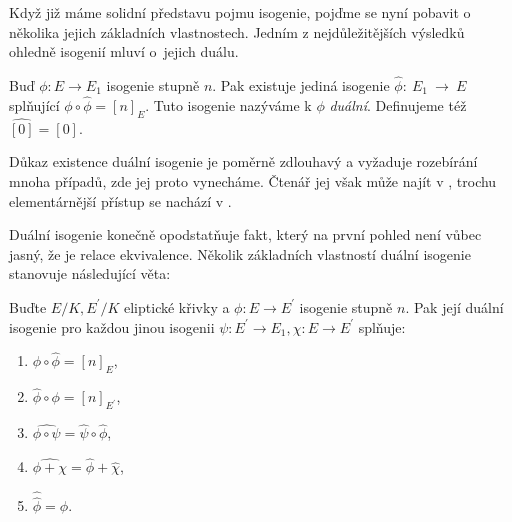 \documentclass[12pt]{report}
\begin{document}
Když již máme solidní představu pojmu isogenie, pojďme se nyní pobavit o několika jejich základních vlastnostech. Jedním z nejdůležitějších výsledků ohledně isogenií mluví o~jejich duálu.

\begin{veta}
Buď $\phi: E \longrightarrow E_1$ isogenie stupně $n$. Pak existuje jediná isogenie $\hat{\phi}:~E_1~\longrightarrow~E$ splňující $\phi \circ \hat{\phi} = [n]_E$. Tuto isogenie nazýváme k $\phi$ \textit{duální}. Definujeme též $\hat{[0]} = [0]$.
\end{veta}
Důkaz existence duální isogenie je poměrně zdlouhavý a vyžaduje rozebírání mnoha případů, zde jej proto vynecháme. Čtenář jej však může najít v \cite[Thm. III.6.1.]{Silverman}, trochu elementárnější přístup se nachází v \cite[Thm. 7.8.]{Sutherland}.

Duální isogenie konečně opodstatňuje fakt, který na první pohled není vůbec jasný, že  je relace ekvivalence. Několik základních vlastností duální isogenie stanovuje následující věta:

\begin{veta}\label{dual}
Buďte $E/K,E^\prime/K$ eliptické křivky a $\phi: E \longrightarrow E^\prime$ isogenie stupně $n$. Pak její duální isogenie pro každou jinou isogenii $\psi:E^\prime \longrightarrow E_1, \chi : E \longrightarrow E^\prime$ splňuje:
\begin{enumerate}
\item $\phi \circ \hat{\phi} = [n]_E$,
\item $\hat{\phi} \circ \phi = [n]_{E^\prime}$,
\item $\widehat{\phi \circ \psi} = \hat{\psi} \circ \hat{\phi}$,
\item $\widehat{\phi + \chi} = \hat{\phi} + \hat{\chi}$,
\item $\hat{\hat{\phi} } = \phi $.
\end{enumerate} 
\end{veta}
\end{document}
